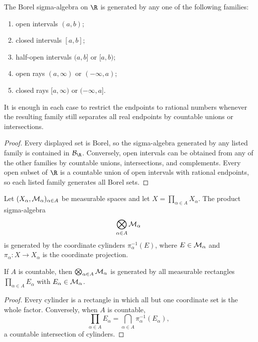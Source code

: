 \begin{prop}[Generators of $\cB_{\R}$]
The Borel sigma-algebra on $\R$ is generated by any one of the following families:
\begin{enumerate}
  \item open intervals $(a,b)$;
  \item closed intervals $[a,b]$;
  \item half-open intervals $(a,b]$ or $[a,b)$;
  \item open rays $(a,\infty)$ or $(-\infty,a)$;
  \item closed rays $[a,\infty)$ or $(-\infty,a]$.
\end{enumerate}
It is enough in each case to restrict the endpoints to rational numbers whenever the resulting family still separates all real endpoints by countable unions or intersections.
\end{prop}

\begin{proof}
Every displayed set is Borel, so the sigma-algebra generated by any listed family is contained in $\cB_{\R}$. Conversely, open intervals can be obtained from any of the other families by countable unions, intersections, and complements. Every open subset of $\R$ is a countable union of open intervals with rational endpoints, so each listed family generates all Borel sets.
\end{proof}

\begin{de}
Let $(X_\alpha,\mathcal{M}_\alpha)_{\alpha\in A}$ be measurable spaces and let $X=\prod_{\alpha\in A}X_\alpha$. The product sigma-algebra
\[
\bigotimes_{\alpha\in A}\mathcal{M}_\alpha
\]
is generated by the coordinate cylinders $\pi_\alpha^{-1}(E)$, where $E\in\mathcal{M}_\alpha$ and $\pi_\alpha:X\to X_\alpha$ is the coordinate projection.
\end{de}

\begin{prop}
If $A$ is countable, then $\bigotimes_{\alpha\in A}\mathcal{M}_\alpha$ is generated by all measurable rectangles $\prod_{\alpha\in A}E_\alpha$ with $E_\alpha\in\mathcal{M}_\alpha$.
\end{prop}

\begin{proof}
Every cylinder is a rectangle in which all but one coordinate set is the whole factor. Conversely, when $A$ is countable,
\[
\prod_{\alpha\in A}E_\alpha
 =\bigcap_{\alpha\in A}\pi_\alpha^{-1}(E_\alpha),
\]
a countable intersection of cylinders.
\end{proof}

